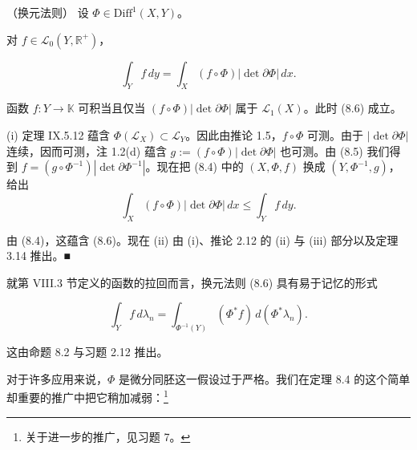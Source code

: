 \begin{theorem}

（换元法则） 设 $ \Phi \in \mathrm{Diff}^{1}(X, Y) $。

\begin{subitems}
\item

对 $ f \in \mathcal{L}_{0}(Y, \mathbb{R}^{+}) $，

\begin{equation}
\int_{Y} f \, dy = \int_{X} (f \circ \Phi)|\det \partial\Phi| \, dx .\tag{8.6}
\end{equation}
\item

函数 $ f : Y \to \mathbb{K} $ 可积当且仅当 $ (f \circ \Phi)|\det \partial\Phi| $ 属于 $ \mathcal{L}_{1}(X) $。此时 (8.6) 成立。

\proofhead
(i) 定理 IX.5.12 蕴含 $ \Phi(\mathcal{L}_{X}) \subset \mathcal{L}_{Y} $。因此由推论 1.5，$ f \circ \Phi $ 可测。由于 $ |\det \partial\Phi| $ 连续，因而可测，注 1.2(d) 蕴含 $ g := (f \circ \Phi)|\det \partial\Phi| $ 也可测。由 (8.5) 我们得到 $ f = (g \circ \Phi^{-1})|\det \partial\Phi^{-1}| $。现在把 (8.4) 中的 $ (X, \Phi, f) $ 换成 $ (Y, \Phi^{-1}, g) $，给出
\[
\int_{X} (f \circ \Phi)|\det \partial\Phi| \, dx \le \int_{Y} f \, dy .
\]

由 (8.4)，这蕴含 (8.6)。现在 (ii) 由 (i)、推论 2.12 的 (ii) 与 (iii) 部分以及定理 3.14 推出。\nobreak\hspace{0.35em}■

\end{subitems}

\end{theorem}

就第 VIII.3 节定义的函数的拉回而言，换元法则 (8.6) 具有易于记忆的形式

\[
\int_{Y} f \, d\lambda_{n} = \int_{\Phi^{-1}(Y)} (\Phi^{*} f) \, d(\Phi^{*}\lambda_{n}) .
\]

这由命题 8.2 与习题 2.12 推出。

对于许多应用来说，$ \Phi $ 是微分同胚这一假设过于严格。我们在定理 8.4 的这个简单却重要的推广中把它稍加减弱：\footnote{关于进一步的推广，见习题 7。}

